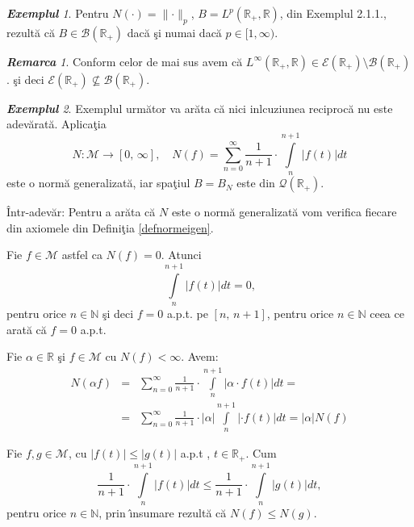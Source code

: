 \documentclass[ a4paper, 12pt]{report}
\theoremstyle{definition}
\theoremstyle{remark}
\newtheorem{remarc}{\bf Remarca}[section]
\newtheorem{exemple}{\bf Exemplul}[section]
\numberwithin{equation}{section}
\begin{document}
\begin{exemple}
Pentru $N(\cdot) = \lVert \cdot \rVert_p$, $B = L^p(\mathbb{R}_+ , \mathbb{R})$, din Exemplul 2.1.1., rezult\u a c\u a $B \in \mathcal{B}(\mathbb{R}_+)$ dac\u a \c si numai dac\u a $p \in [1, \infty)$.
\end{exemple}
\begin{remarc} Conform celor de mai sus avem c\u a $L^\infty (\mathbb{R}_+ , \mathbb{R}) \in \mathcal{E}(\mathbb{R}_+)\setminus \mathcal{B}(\mathbb{R}_+)$. \c si deci
$\mathcal{E}(\mathbb{R}_+) \nsubseteq \mathcal{B}(\mathbb{R}_+)$.
\end{remarc}
\begin{exemple} Exemplul urm\u ator va ar\u ata c\u a nici inlcuziunea reciproc\u a nu este adev\u arat\u a. Aplica\c tia
\[ N : \mathcal{M} \to [0, \, \infty], \quad
N(f) = \sum\limits_{n=0}^{\infty} {\frac{1}{n+1} \cdot \int\limits_{n}^{n+1}{\lvert f(t) \rvert dt}}\]
este o norm\u a generalizat\u a, iar spa\c tiul $B = B_N$ este din $\mathcal{Q}(\mathbb{R}_+)$.
\end{exemple}
\^ Intr-adev\u ar: Pentru a ar\u ata c\u a $N$ este o norm\u a  generalizat\u a vom verifica fiecare din axiomele din Defini\c tia \ref{defnormeigen}.

Fie $f \in \mathcal{M}$ astfel ca $N(f) = 0$. Atunci
$$\int\limits_{n}^{n+1}\lvert f(t) \rvert dt = 0,$$ pentru orice $n \in \mathbb{N}$ \c si deci $f = 0$ a.p.t. pe $[n,\, n+1]$, pentru orice $n \in \mathbb{N}$ ceea ce arat\u a c\u a $f = 0$ a.p.t.

\smallskip

Fie $\alpha \in \mathbb{R}$ \c si $f \in \mathcal{M}$ cu $N(f) < \infty$. Avem:
\begin{eqnarray*}
N(\alpha f)&=&\sum\limits_{n=0}^{\infty}{\frac{1}{n+1} \cdot \int\limits_{n}^{n+1}{\lvert \alpha \cdot f(t) \rvert} dt} = \\
&=&\sum\limits_{n=0}^{\infty}{\frac{1}{n+1} \cdot |\alpha| \int\limits_{n}^{n+1}{\lvert \cdot f(t) \rvert} dt} = |\alpha| N(f)
\end{eqnarray*}

\smallskip
Fie $f, g \in \mathcal{M}$, cu $\lvert f(t) \rvert\leq \lvert g(t) \rvert $ a.p.t , $ t \in \mathbb{R}_+$. Cum
 $$\frac{1}{n+1} \cdot \int\limits_{n}^{n+1}{\lvert f(t) \rvert dt} \leq \frac{1}{n+1} \cdot \int\limits_{n}^{n+1}{\lvert g(t) \rvert dt},$$
 pentru orice $n \in \mathbb{N}$, prin \^\i nsumare rezult\u a c\u a $N(f) \leq N(g)$.

\smallskip
\end{document}
